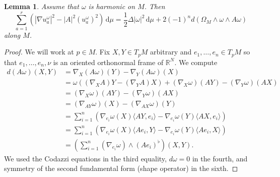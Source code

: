 \documentclass[11pt]{amsart}
\numberwithin{equation}{section}
\theoremstyle{plain}
\newtheorem{lemma}[lemma]{Lemma}
\theoremstyle{definition}
\theoremstyle{remark}
\newcommand{\R}{\mathbb{R}}
\newcommand{\dvol}{\,\mathrm{d}\mu}%
\newcommand{\bangle}[1]{\langle #1 \rangle}
\begin{document}
\begin{lemma}\label{lemm:sumQua-terms}
Assume that $\omega$ is harmonic on $M$. Then
\[
\sum_{a=1}^r \left(|\nabla u^\omega_a|^2 - |A|^2 (u_a^\omega)^2\right) \dvol = \frac 12 \Delta |\omega|^2 \dvol + 2 (-1)^n d( \Omega_M \wedge \omega \wedge A \omega)
\]
along $M$. 
\end{lemma}
\begin{proof}
We will work at $p\in M$. Fix $X,Y \in T_pM$ arbitrary and $e_1,\dots,e_n\in T_pM$ so that $e_1,\dots,e_n,\nu$ is an oriented orthonormal frame of $\R^N$. We compute 
\begin{equation}\label{eq:dAw-codazzi}
\begin{split}
d(A\omega)(X,Y) & = \nabla_{X}(A\omega)(Y) - \nabla_{Y}(A\omega)(X)\\
& = \omega((\nabla_{X}A) Y - (\nabla_{Y} A)X) + (\nabla_{X}\omega)(AY) - (\nabla_{Y}\omega)(AX)\\
& = (\nabla_{X}\omega)(AY) - (\nabla_{Y}\omega)(AX)\\
& = (\nabla_{AY}\omega)(X) - (\nabla_{AX}\omega)(Y)\\
& = \sum_{i=1}^n \left( \nabla_{e_i} \omega(X) \bangle{AY,e_i} - \nabla_{e_i} \omega(Y) \bangle{AX,e_i} \right)\\
& = \sum_{i=1}^n \left( \nabla_{e_i} \omega(X) \bangle{Ae_i,Y} - \nabla_{e_i} \omega(Y) \bangle{Ae_i,X}\right)\\
& = \left( \sum_{i=1}^n (\nabla_{e_i}\omega) \wedge (Ae_i)^\flat \right) (X,Y).
\end{split}
\end{equation}
We used the Codazzi equations in the third equality, $d\omega = 0$ in the fourth, and symmetry of the second fundamental form (shape operator) in the sixth. 


\end{proof}
\end{document}
